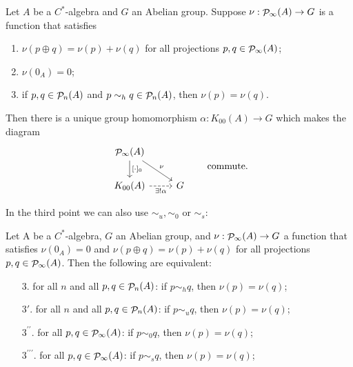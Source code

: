 \begin{proposition}
Let $A$ be a $C^*$-algebra and $G$ an Abelian group. Suppose $\nu:\mathop{\mathcal{P}}\nolimits_\infty(A)\to G$ is a function that satisfies
\begin{enumerate}
\item $\nu(p\oplus q) = \nu(p)+\nu(q)$ for all projections $p,q\in\mathop{\mathcal{P}}\nolimits_\infty(A)$;
\item $\nu(0_A) = 0$;
\item if $p,q\in\mathop{\mathcal{P}}\nolimits_n(A)$ and $p\sim_h q \in \mathop{\mathcal{P}}\nolimits_n(A)$, then $\nu(p) = \nu(q)$.
\end{enumerate}
Then there is a unique group homomorphism $\alpha: K_{00}(A) \to G$ which makes the diagram
\[ \begin{tikzcd}
\Projections_\infty(A) \ar[d,"{[\cdot]_0}"] \ar[dr, "\nu"] & \\
K_{00}(A) \ar[r, dashed, swap, "\exists! \alpha"] & G
\end{tikzcd} \qquad \text{commute.}\]
\end{proposition}
In the third point we can also use $\sim_u, \sim_0$ or $\sim_s$:
\begin{proposition}
Let A be a $C^*$-algebra, $G$ an Abelian group, and
$\nu: \mathop{\mathcal{P}}\nolimits_\infty(A) \to G$ a function that satisfies $\nu(0_A) = 0$ and $\nu(p\oplus q) = \nu(p) + \nu(q)$ for all projections $p,q\in\mathop{\mathcal{P}}\nolimits_\infty(A)$. Then the following are equivalent:
\begin{itemize}
\item[$3.$] for all $n$ and all $p,q\in \mathop{\mathcal{P}}\nolimits_n(A)$: if $p\sim_h q$, then $\nu(p) = \nu(q)$;
\item[$3'.$]for all $n$ and all $p,q\in \mathop{\mathcal{P}}\nolimits_n(A)$: if $p\sim_u q$, then $\nu(p) = \nu(q)$;
\item[$3^{\prime\prime}.$] for all  $p,q\in \mathop{\mathcal{P}}\nolimits_\infty(A)$: if $p\sim_0 q$, then $\nu(p) = \nu(q)$;
\item[$3^{\prime\prime\prime}.$] for all  $p,q\in \mathop{\mathcal{P}}\nolimits_\infty(A)$: if $p\sim_s q$, then $\nu(p) = \nu(q)$;
\end{itemize}
\end{proposition}
